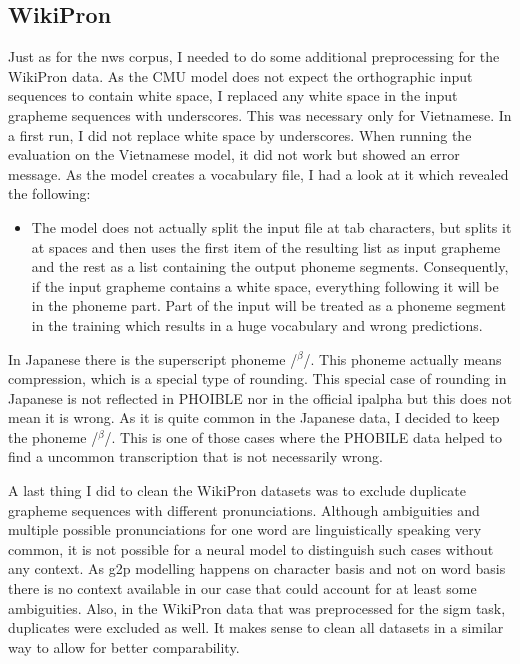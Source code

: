 \subsection*{WikiPron} 
Just as for the \ac{nws} corpus, I needed to do some additional preprocessing for the WikiPron data. As the CMU model does not expect the orthographic input sequences to contain white space, I replaced any white space in the input grapheme sequences with underscores. This was necessary only for Vietnamese. In a first run, I did not replace white space by underscores. When running the evaluation on the Vietnamese model, it did not work but showed an error message. As the model creates a vocabulary file, I had a look at it which revealed the following: 
\begin{itemize}
\item The model does not actually split the input file at tab characters, but splits it at spaces and then uses the first item of the resulting list as input grapheme and the rest as a list containing the output phoneme segments. Consequently, if the input grapheme contains a white space, everything following it will be in the phoneme part. Part of the input will be treated as a phoneme segment in the training which results in a huge vocabulary and wrong predictions.
\end{itemize}

In Japanese there is the superscript phoneme /$^\beta$/. This phoneme actually means compression, which is a special type of rounding. This special case of rounding in Japanese is not reflected in PHOIBLE nor in the official \ac{ipalpha} but this does not mean it is wrong. As it is quite common in the Japanese data, I decided to keep the phoneme /$^\beta$/. This is one of those cases where the PHOBILE data helped to find a uncommon transcription that is not necessarily wrong.

A last thing I did to clean the WikiPron datasets was to exclude duplicate grapheme sequences with different pronunciations. Although ambiguities and multiple possible pronunciations for one word are linguistically speaking very common, it is not possible for a neural model to distinguish such cases without any context. As \ac{g2p} modelling happens on character basis and not on word basis there is no context available in our case that could account for at least some ambiguities. Also, in the WikiPron data that was preprocessed for the \ac{sigm} task, duplicates were excluded as well. It makes sense to clean all datasets in a similar way to allow for better comparability.


